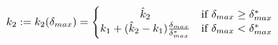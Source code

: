 \documentclass[12pt]{article}
\begin{document}
$$ 
k_2 := k_2 (\delta_{max}) = \left\{\begin{matrix}
\hat k_2 & \textup{if } \delta_{max} \geq \delta^*_{max} \\ 
k_1 + (\hat k_2 - k_1 ) \frac{\delta_{max}}{\delta^*_{max}} & \textup{if } \delta_{max} < \delta^*_{max}
\end{matrix}\right.
$$
\end{document}
